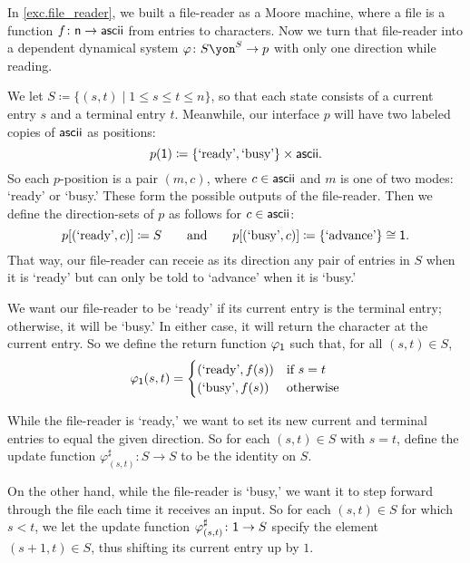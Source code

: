 \documentclass[Book-Poly]{subfiles}
\begin{document}
\begin{example}\label{ex.generalized_file_reader}
In \cref{exc.file_reader}, we built a file-reader as a Moore machine, where a file is a function $f\colon\mathsf{n}\to\mathsf{ascii}$ from entries to characters.
Now we turn that file-reader into a dependent dynamical system $\varphi\colon S\yon^S\to p$ with only one direction while reading.

We let $S \coloneqq \{(s,t)\mid 1\leq s\leq t\leq n\}$, so that each state consists of a current entry $s$ and a terminal entry $t$.
Meanwhile, our interface $p$ will have two labeled copies of $\mathsf{ascii}$ as positions:
\[
    p(\textsf{1})\coloneqq\{\text{`ready'}, \text{`busy'}\}\times\mathsf{ascii}.
\]
So each $p$-position is a pair $(m,c)$, where $c\in\mathsf{ascii}$ and $m$ is one of two modes: `ready' or `busy.'
These form the possible outputs of the file-reader.
Then we define the direction-sets of $p$ as follows for $c\in\mathsf{ascii}$:
\[
    p[(\text{`ready'}, c)]\coloneqq S \qquad\text{and}\qquad p[(\text{`busy'}, c)]\coloneqq\{\text{`advance'}\}\cong\textsf{1}.
\]
That way, our file-reader can receie as its direction any pair of entries in $S$ when it is `ready' but can only be told to `advance' when it is `busy.'

We want our file-reader to be `ready' if its current entry is the terminal entry; otherwise, it will be `busy.'
In either case, it will return the character at the current entry.
So we define the return function $\varphi_{\textsf{1}}$ such that, for all $(s,t)\in S$,
\begin{align*}
  \varphi_{\textsf{1}}(s, t) =
  \begin{cases}
    (\text{`ready'}, f(s)) &\mbox{if $s = t$}\\
    (\text{`busy'}, f(s)) &\mbox{otherwise}
  \end{cases}
\end{align*}

While the file-reader is `ready,' we want to set its new current and terminal entries to equal the given direction.
So for each $(s,t)\in S$ with $s=t$, define the update function $\varphi^\sharp_{(s,t)}\colon S\to S$ to be the identity on $S$.

On the other hand, while the file-reader is `busy,' we want it to step forward through the file each time it receives an input.
So for each $(s,t)\in S$ for which $s<t$, we let the update function $\varphi^\sharp_{(s,t)}\colon\textsf{1}\to S$ specify the element $(s+1,t)\in S$, thus shifting its current entry up by $1$.
\end{example}
\end{document}
